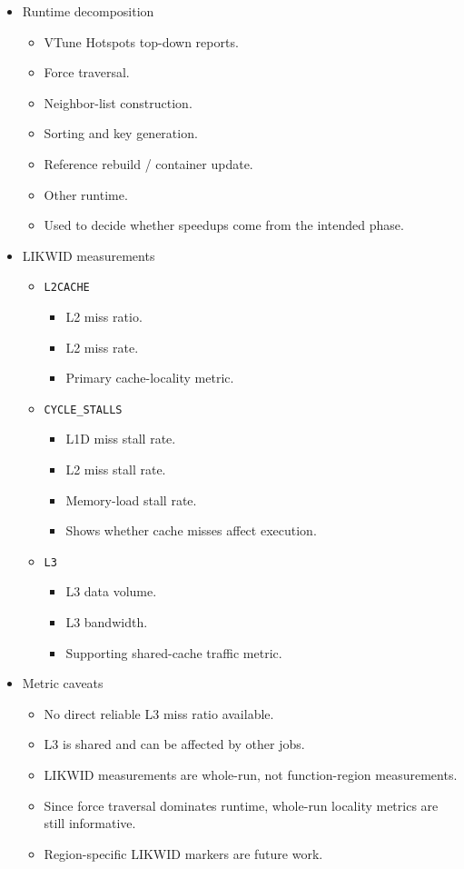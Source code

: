 \begin{itemize}
    \item Runtime decomposition
    \begin{itemize}
        \item VTune Hotspots top-down reports.
        \item Force traversal.
        \item Neighbor-list construction.
        \item Sorting and key generation.
        \item Reference rebuild / container update.
        \item Other runtime.
        \item Used to decide whether speedups come from the intended phase.
    \end{itemize}

    \item LIKWID measurements
    \begin{itemize}
        \item \texttt{L2CACHE}
        \begin{itemize}
            \item L2 miss ratio.
            \item L2 miss rate.
            \item Primary cache-locality metric.
        \end{itemize}
        \item \texttt{CYCLE\_STALLS}
        \begin{itemize}
            \item L1D miss stall rate.
            \item L2 miss stall rate.
            \item Memory-load stall rate.
            \item Shows whether cache misses affect execution.
        \end{itemize}
        \item \texttt{L3}
        \begin{itemize}
            \item L3 data volume.
            \item L3 bandwidth.
            \item Supporting shared-cache traffic metric.
        \end{itemize}
    \end{itemize}

    \item Metric caveats
    \begin{itemize}
        \item No direct reliable L3 miss ratio available.
        \item L3 is shared and can be affected by other jobs.
        \item LIKWID measurements are whole-run, not function-region measurements.
        \item Since force traversal dominates runtime, whole-run locality metrics are still informative.
        \item Region-specific LIKWID markers are future work.
    \end{itemize}
\end{itemize}
